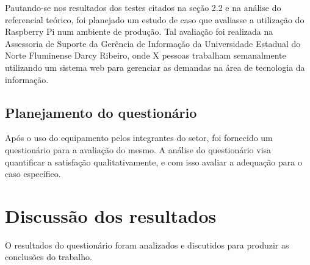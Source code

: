 Pautando-se nos resultados dos testes citados na seção 2.2 e na análise do referencial teórico, foi planejado um estudo de caso que avaliasse a utilização do Raspberry Pi num ambiente de produção. Tal avaliação foi realizada na Assessoria de Suporte da Gerência de Informação da Universidade Estadual do Norte Fluminense Darcy Ribeiro, onde X pessoas trabalham semanalmente utilizando um sistema web para gerenciar as demandas na área de tecnologia da informação.

\subsection{Planejamento do questionário}

Após o uso do equipamento pelos integrantes do setor, foi fornecido um questionário para a avaliação do mesmo. A análise do questionário visa quantificar a satisfação qualitativamente, e com isso avaliar a adequação para o caso específico.

\section{Discussão dos resultados}

O resultados do questionário foram analizados e discutidos para produzir as conclusões do trabalho.